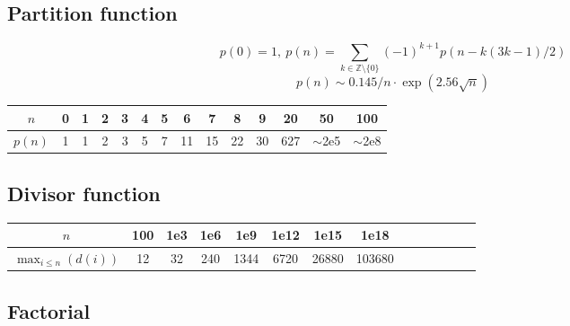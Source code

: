 \subsection{Partition function}
\[ p(0) = 1,\ p(n) = \sum_{k \in \mathbb Z \setminus \{0\}}{(-1)^{k+1} p(n - k(3k-1) / 2)} \]
\[ p(n) \sim 0.145 / n \cdot \exp(2.56 \sqrt{n}) \]

\begin{center}
\begin{tabular}{c|c@{\ }c@{\ }c@{\ }c@{\ }c@{\ }c@{\ }c@{\ }c@{\ }c@{\ }c@{\ }c@{\ }c@{\ }c}
        $n$    & 0 & 1 & 2 & 3 & 4 & 5 & 6  & 7  & 8  & 9  & 20  & 50  & 100 \\ \hline
        $p(n)$ & 1 & 1 & 2 & 3 & 5 & 7 & 11 & 15 & 22 & 30 & 627 & $\mathtt{\sim}$2e5 & $\mathtt{\sim}$2e8 \\
\end{tabular}
\end{center}

\subsection{Divisor function}
\begin{center}
\begin{tabular}{c|c@{\ }c@{\ }c@{\ }c@{\ }c@{\ }c@{\ }c@{\ }c@{\ }c@{\ }c@{\ }c@{\ }c@{\ }c}
        $n$                      & 100 & 1e3 & 1e6 & 1e9  & 1e12 & 1e15  & 1e18 \\ \hline
        $\max _ {i\leq n}(d(i))$ & 12  & 32  & 240 & 1344 & 6720 & 26880 & 103680 \\
\end{tabular}
\end{center}

\subsection{Factorial}


